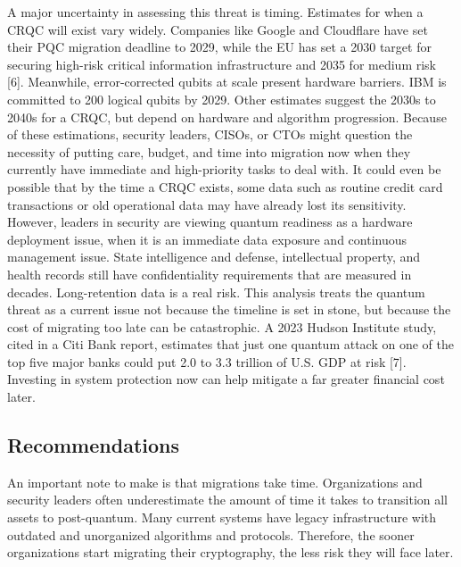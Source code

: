 \documentclass{article}
\begin{document}
A major uncertainty in assessing this threat is timing. Estimates for when a CRQC will exist vary widely. Companies like Google and Cloudflare have set their PQC migration deadline to 2029, while the EU has set a 2030 target for securing high-risk critical information infrastructure and 2035 for medium risk [6]. Meanwhile, error-corrected qubits at scale present hardware barriers.
IBM is committed to 200 logical qubits by 2029. Other estimates suggest the 2030s to 2040s for a CRQC, but depend on hardware and algorithm progression. Because of these estimations, security leaders, CISOs, or CTOs might question the necessity of putting care, budget, and time into migration now when they currently have immediate and high-priority tasks to deal with. It could even be possible that by the time a CRQC exists, some data such as routine credit card transactions or old operational data may have already lost its sensitivity. However, leaders in security are viewing quantum readiness as a hardware deployment issue, when it is an immediate data exposure and continuous management issue. State intelligence and defense, intellectual property, and health records still have confidentiality requirements that are measured in decades. Long-retention data is a real risk. This analysis treats the quantum threat as a current issue not because the timeline is set in stone, but because the cost of migrating too late can be catastrophic. A 2023 Hudson Institute study, cited in a Citi Bank report, estimates that just one quantum attack on one of the top five major banks could put 2.0 to 3.3 trillion of U.S. GDP at risk [7]. Investing in system protection now can help mitigate a far greater financial cost later. 

\subsection{Recommendations}

An important note to make is that migrations take time. Organizations and security leaders often underestimate the amount of time it takes to transition all assets to post-quantum. Many current systems have legacy infrastructure with outdated and unorganized algorithms and protocols. Therefore, the sooner organizations start migrating their cryptography, the less risk they will face later. 
\end{document}
